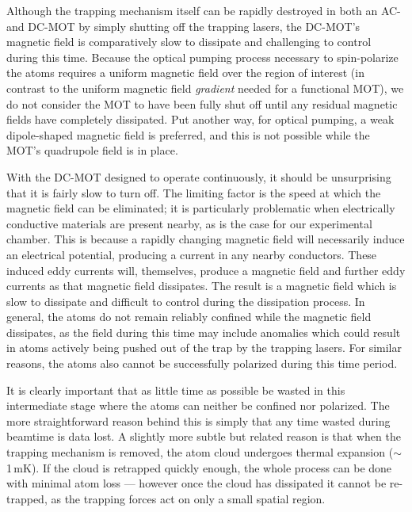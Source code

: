 Although the trapping mechanism itself can be rapidly destroyed in both an AC- and DC-MOT by simply shutting off the trapping lasers, the DC-MOT's magnetic field is comparatively slow to dissipate and challenging to control during this time.  Because the optical pumping process 
necessary to spin-polarize the atoms 
requires a uniform magnetic field 
over the region of interest 
(in contrast to the uniform magnetic field \emph{gradient} needed for a functional MOT), we do not consider the MOT to have been fully shut off until any residual magnetic fields have completely dissipated.  
Put another way, 
for optical pumping, a weak dipole-shaped magnetic field is preferred, and this is not possible while the MOT's quadrupole field is in place.  %

With the DC-MOT designed to operate continuously, 
it should be unsurprising that it 
is fairly slow to turn off.  The limiting factor is the speed at which the magnetic field can be eliminated; it is particularly problematic when electrically conductive materials are present nearby, as is the case for our experimental chamber.  
This is because a rapidly changing magnetic field will necessarily induce an electrical potential, producing a current in any nearby conductors.  These induced eddy currents will, themselves, produce a magnetic field and further eddy currents as that magnetic field dissipates.  The result is a magnetic field which is slow to dissipate and difficult to control during the dissipation process.  In general, the atoms do not remain reliably confined while the magnetic field dissipates, as the field during this time may include anomalies which could result in atoms actively being pushed out of the trap by the trapping lasers.  For similar reasons, the atoms also cannot be successfully polarized during this time period.  

It is clearly important that as little time as possible be wasted in this intermediate stage where the atoms can neither be confined nor polarized.  The more straightforward reason behind this is simply that any time wasted during beamtime is data lost.  A slightly more subtle but related reason is that when the trapping mechanism is removed, the atom cloud undergoes thermal expansion ($\sim$1\,mK).  If the cloud is retrapped quickly enough, the whole process can be done with minimal atom loss --- however once the cloud has dissipated it cannot be re-trapped, as the trapping forces act on only a small spatial region.

